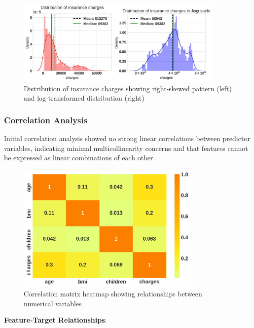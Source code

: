 \documentclass[12pt,a4paper]{article}
\begin{document}
\begin{figure}[H]
\centering
\includegraphics[width=0.9\textwidth]{charges_distribution.png}
\caption{Distribution of insurance charges showing right-skewed pattern (left) and log-transformed distribution (right)}
\label{fig:charges_distribution}
\end{figure}

\subsubsection{Correlation Analysis}
Initial correlation analysis showed no strong linear correlations between predictor variables, indicating minimal multicollinearity concerns and that features cannot be expressed as linear combinations of each other.

\begin{figure}[H]
\centering
\includegraphics[width=0.8\textwidth]{correlation_heatmap.png}
\caption{Correlation matrix heatmap showing relationships between numerical variables}
\label{fig:correlation_heatmap}
\end{figure}


\newpage

\textbf{Feature-Target Relationships}:
\end{document}
